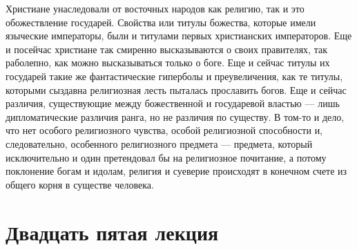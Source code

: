 \documentclass[12pt]{article}
\begin{document}
Христиане унаследовали от восточных народов как религию, так и это обожествление государей. Свойства или титулы божества, которые имели языческие императоры, были и титулами первых христианских императоров. Еще и посейчас христиане так смиренно высказываются о своих правителях, так раболепно, как можно высказываться только о боге. Еще и сейчас титулы их государей такие же фантастические гиперболы и преувеличения, как те титулы, которыми сыздавна религиозная лесть пыталась прославить богов. Еще и сейчас различия, существующие между божественной и государевой властью --- лишь дипломатические различия ранга, но не различия по существу. В том-то и дело, что нет особого религиозного чувства, особой религиозной способности и, следовательно, особенного религиозного предмета --- предмета, который исключительно и один претендовал бы на религиозное почитание, а потому поклонение богам и идолам, религия и суеверие происходят в конечном счете из общего корня в существе человека. 

{}
\section*{Двадцать пятая лекция}
\end{document}
